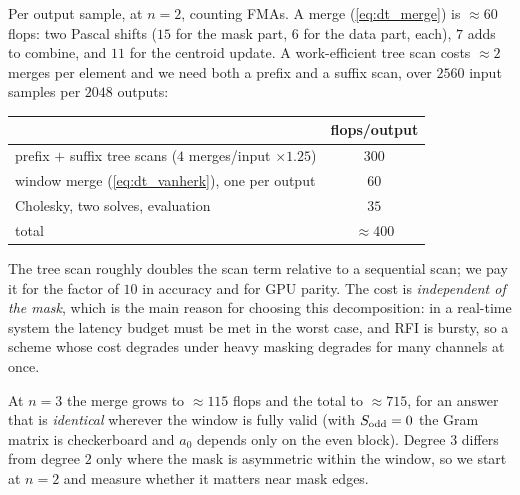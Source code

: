 \documentclass{article}
\numberwithin{equation}{section}   %
\begin{document}
Per output sample, at $n=2$, counting FMAs.  A merge (\ref{eq:dt_merge}) is $\approx 60$ flops: two Pascal
shifts ($15$ for the mask part, $6$ for the data part, each), $7$ adds to combine, and $11$ for the centroid
update.  A work-efficient tree scan costs $\approx 2$ merges per element and we need both a prefix and a
suffix scan, over $2560$ input samples per $2048$ outputs:
\begin{center}
\small
\begin{tabular}{lc}
\toprule
 & flops/output \\
\midrule
prefix $+$ suffix tree scans ($4$ merges/input $\times 1.25$) & $300$ \\
window merge (\ref{eq:dt_vanherk}), one per output           & $60$ \\
Cholesky, two solves, evaluation                             & $35$ \\
\midrule
total & $\approx 400$ \\
\bottomrule
\end{tabular}
\end{center}
The tree scan roughly doubles the scan term relative to a sequential scan; we pay it for the factor of $10$
in accuracy and for GPU parity.  The cost is {\em independent of the mask}, which is the main reason for
choosing this decomposition: in a real-time system the latency budget must be met in the worst case, and RFI
is bursty, so a scheme whose cost degrades under heavy masking degrades for many channels at once.

At $n=3$ the merge grows to $\approx 115$ flops and the total to $\approx 715$, for an answer that is
{\em identical} wherever the window is fully valid (with $S_{\rm odd} = 0$ the Gram matrix is checkerboard and
$a_0$ depends only on the even block).  Degree $3$ differs from degree $2$ only where the mask is asymmetric
within the window, so we start at $n=2$ and measure whether it matters near mask edges.
\end{document}
